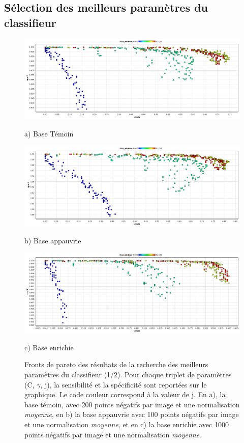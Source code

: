 \subsection{Sélection des meilleurs paramètres du classifieur}
\begin{figure}[h!]
\begin{center}
 \includegraphics[width=14cm]{images/pareto_param_200.png}

{\small a) Base Témoin}
\vspace{0.5cm}

\includegraphics[width=14cm]{images/pareto_param_100.png}

{\small b) Base appauvrie}

 \includegraphics[width=14cm]{images/pareto_param_1000.png}
 
{\small c) Base enrichie}

\end{center}
 \caption{Fronts de pareto des résultats de la recherche des meilleurs paramètres du classifieur (1/2). Pour chaque triplet de paramètres (C, $\gamma$, j), la sensibilité et la spécificité sont reportées sur le graphique. Le code couleur correspond à la valeur de j. En a), la base témoin, avec 200 points négatifs par image et une normalisation \emph{moyenne}, en b) la base appauvrie avec 100 points négatifs par image et une normalisation \emph{moyenne}, et en c) la base enrichie avec 1000 points négatifs par image et une normalisation \emph{moyenne}.}
\label{fig:paretoParams1}
\end{figure}



